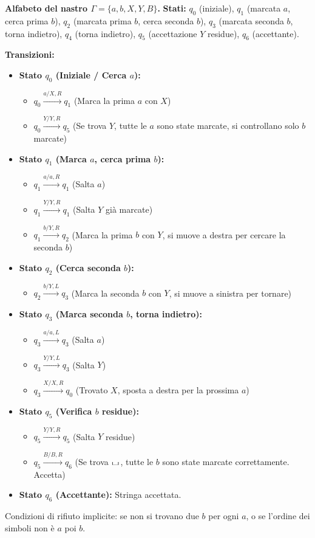 \documentclass[a4paper]{article}
\theoremstyle{definition} %
\newcommand{\blankS}{\ensuremath{\raisebox{-0.15ex}{\scalebox{1.3}[0.7]{$\sqcup$}}\mkern2mu}}
\begin{document}
\noindent \textbf{Alfabeto del nastro $\Gamma = \{a, b, X, Y, B\}$.}
\noindent \textbf{Stati:} $q_0$ (iniziale), $q_1$ (marcata $a$, cerca prima $b$), $q_2$ (marcata prima $b$, cerca seconda $b$), $q_3$ (marcata seconda $b$, torna indietro), $q_4$ (torna indietro), $q_5$ (accettazione $Y$ residue), $q_6$ (accettante).

\noindent \textbf{Transizioni:}
\begin{itemize}
    \item \textbf{Stato $q_0$ (Iniziale / Cerca $a$):}
        \begin{itemize}
            \item $q_0 \xrightarrow{a / X, R} q_1$ (Marca la prima $a$ con $X$)
            \item $q_0 \xrightarrow{Y / Y, R} q_5$ (Se trova $Y$, tutte le $a$ sono state marcate, si controllano solo $b$ marcate)
        \end{itemize}
    \item \textbf{Stato $q_1$ (Marca $a$, cerca prima $b$):}
        \begin{itemize}
            \item $q_1 \xrightarrow{a / a, R} q_1$ (Salta $a$)
            \item $q_1 \xrightarrow{Y / Y, R} q_1$ (Salta $Y$ già marcate)
            \item $q_1 \xrightarrow{b / Y, R} q_2$ (Marca la prima $b$ con $Y$, si muove a destra per cercare la seconda $b$)
        \end{itemize}
    \item \textbf{Stato $q_2$ (Cerca seconda $b$):}
        \begin{itemize}
            \item $q_2 \xrightarrow{b / Y, L} q_3$ (Marca la seconda $b$ con $Y$, si muove a sinistra per tornare)
        \end{itemize}
    \item \textbf{Stato $q_3$ (Marca seconda $b$, torna indietro):}
        \begin{itemize}
            \item $q_3 \xrightarrow{a / a, L} q_3$ (Salta $a$)
            \item $q_3 \xrightarrow{Y / Y, L} q_3$ (Salta $Y$)
            \item $q_3 \xrightarrow{X / X, R} q_0$ (Trovato $X$, sposta a destra per la prossima $a$)
        \end{itemize}
    \item \textbf{Stato $q_5$ (Verifica $b$ residue):}
        \begin{itemize}
            \item $q_5 \xrightarrow{Y / Y, R} q_5$ (Salta $Y$ residue)
            \item $q_5 \xrightarrow{B / B, R} q_6$ (Se trova \blankS, tutte le $b$ sono state marcate correttamente. Accetta)
        \end{itemize}
    \item \textbf{Stato $q_6$ (Accettante):} Stringa accettata.
\end{itemize}
Condizioni di rifiuto implicite: se non si trovano due $b$ per ogni $a$, o se l'ordine dei simboli non è $a$ poi $b$.
\end{document}
